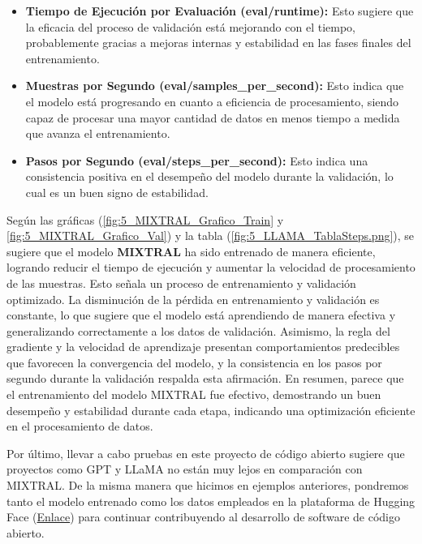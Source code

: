 \bigskip %

\begin{itemize}
    \item \textbf{Tiempo de Ejecución por Evaluación (eval/runtime):} Esto sugiere que la eficacia del proceso de validación está mejorando con el tiempo, probablemente gracias a mejoras internas y estabilidad en las fases finales del entrenamiento.
    \item \textbf{Muestras por Segundo (eval/samples\_per\_second):} Esto indica que el modelo está progresando en cuanto a eficiencia de procesamiento, siendo capaz de procesar una mayor cantidad de datos en menos tiempo a medida que avanza el entrenamiento.
    \item \textbf{Pasos por Segundo (eval/steps\_per\_second):} Esto indica una consistencia positiva en el desempeño del modelo durante la validación, lo cual es un buen signo de estabilidad.
\end{itemize}

\bigskip %

Según las gráficas (\ref{fig:5_MIXTRAL_Grafico_Train} y \ref{fig:5_MIXTRAL_Grafico_Val}) y la tabla (\ref{fig:5_LLAMA_TablaSteps.png}), se sugiere que el modelo \textbf{MIXTRAL} ha sido entrenado de manera eficiente, logrando reducir el tiempo de ejecución y aumentar la velocidad de procesamiento de las muestras. Esto señala un proceso de entrenamiento y validación optimizado. La disminución de la pérdida en entrenamiento y validación es constante, lo que sugiere que el modelo está aprendiendo de manera efectiva y generalizando correctamente a los datos de validación. Asimismo, la regla del gradiente y la velocidad de aprendizaje presentan comportamientos predecibles que favorecen la convergencia del modelo, y la consistencia en los pasos por segundo durante la validación respalda esta afirmación. En resumen, parece que el entrenamiento del modelo MIXTRAL fue efectivo, demostrando un buen desempeño y estabilidad durante cada etapa, indicando una optimización eficiente en el procesamiento de datos.

\bigskip %

Por último, llevar a cabo pruebas en este proyecto de código abierto sugiere que proyectos como \acrshort{GPT} y \acrshort{LLaMA} no están muy lejos en comparación con MIXTRAL. De la misma manera que hicimos en ejemplos anteriores, pondremos tanto el modelo entrenado como los datos empleados en la plataforma de Hugging Face (\href{https://huggingface.co/eibeel/mixtral_tfg}{Enlace}) para continuar contribuyendo al desarrollo de software de código abierto.


